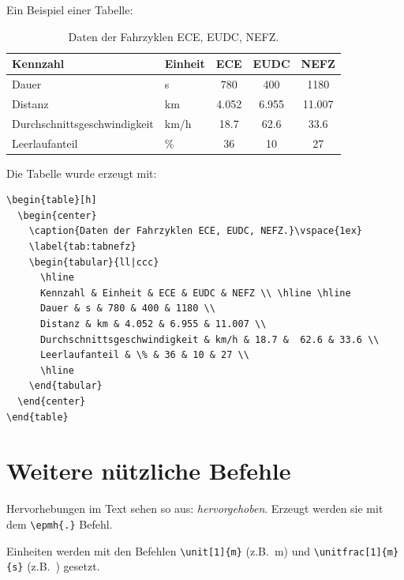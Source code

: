  Ein Beispiel einer Tabelle:
 \begin{table}[h]
   \begin{center}
     \caption{Daten der Fahrzyklen ECE, EUDC, NEFZ.}\vspace{1ex}
     \label{tab:tabnefz}
     \begin{tabular}{ll|ccc}
       \hline
       Kennzahl & Einheit & ECE & EUDC & NEFZ \\ \hline \hline
       Dauer & s & 780 & 400 & 1180 \\
       Distanz & km & 4.052 & 6.955 & 11.007 \\
       Durchschnittsgeschwindigkeit & km/h & 18.7 &  62.6 & 33.6 \\
       Leerlaufanteil & \% & 36 & 10 & 27 \\
       \hline
     \end{tabular}
   \end{center}
 \end{table}

 Die Tabelle wurde erzeugt mit:
\begin{verbatim}
\begin{table}[h]
  \begin{center}
    \caption{Daten der Fahrzyklen ECE, EUDC, NEFZ.}\vspace{1ex}
    \label{tab:tabnefz}
    \begin{tabular}{ll|ccc}
      \hline
      Kennzahl & Einheit & ECE & EUDC & NEFZ \\ \hline \hline
      Dauer & s & 780 & 400 & 1180 \\
      Distanz & km & 4.052 & 6.955 & 11.007 \\
      Durchschnittsgeschwindigkeit & km/h & 18.7 &  62.6 & 33.6 \\
      Leerlaufanteil & \% & 36 & 10 & 27 \\
      \hline
    \end{tabular}
  \end{center}
\end{table}
\end{verbatim}



\section{Weitere nützliche Befehle}\label{sec:div}

Hervorhebungen im Text sehen so aus: \emph{hervorgehoben}. Erzeugt
werden sie mit dem \texttt{\textbackslash epmh\{.\}} Befehl.

Einheiten werden mit den Befehlen \texttt{\textbackslash unit[1]\{m\}}
(z.B.~\unit[1]{m}) und \texttt{\textbackslash unitfrac[1]\{m\}\{s\}}
(z.B.~) gesetzt.
